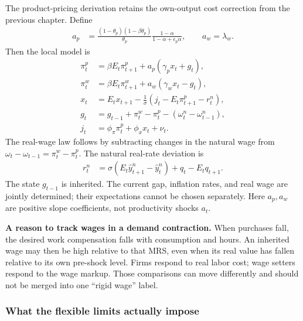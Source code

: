 The product-pricing derivation retains the own-output cost correction from
the previous chapter. Define
\begin{align}
 a_p&=\frac{(1-\theta_p)(1-\beta\theta_p)}{\theta_p}
                  \frac{1-\alpha}{1-\alpha+\epsilon_p\alpha},\qquad
 a_w=\lambda_w.
\end{align}
Then the local model is
\begin{align}
 \pi_t^p&=\beta E_t\pi_{t+1}^p+a_p(\gamma_p x_t+g_t),
 \label{eq:sw-price-system}\\
 \pi_t^w&=\beta E_t\pi_{t+1}^w+a_w(\gamma_w x_t-g_t),
 \label{eq:sw-wage-system}\\
 x_t&=E_tx_{t+1}-\frac1\sigma(j_t-E_t\pi_{t+1}^p-r_t^n),
 \label{eq:sw-is-system}\\
 g_t&=g_{t-1}+\pi_t^w-\pi_t^p-(\omega_t^n-\omega_{t-1}^n),
 \label{eq:sw-gap-law}\\
 j_t&=\phi_\pi\pi_t^p+\phi_xx_t+\nu_t.
 \label{eq:sw-policy-system}
\end{align}
The real-wage law follows by subtracting changes in the natural wage from
$\omega_t-\omega_{t-1}=\pi_t^w-\pi_t^p$. The natural real-rate deviation is
\begin{align}
 r_t^n&=\sigma(E_t\hat y_{t+1}^n-\hat y_t^n)+q_t-E_tq_{t+1}.
\end{align}
The state $g_{t-1}$ is inherited. The current gap, inflation rates, and real
wage are jointly determined; their expectations cannot be chosen separately.
Here $a_p,a_w$ are positive slope coefficients, not productivity shocks $a_t$.

\begin{greenblock}
\textbf{A reason to track wages in a demand contraction.}
When purchases fall, the desired work compensation falls with consumption and
hours. An inherited wage may then be high relative to that MRS, even when its
real value has fallen relative to its own pre-shock level. Firms respond to
real labor cost; wage setters respond to the wage markup. Those comparisons
can move differently and should not be merged into one ``rigid wage'' label.
\end{greenblock}

\subsubsection{What the flexible limits actually impose}

